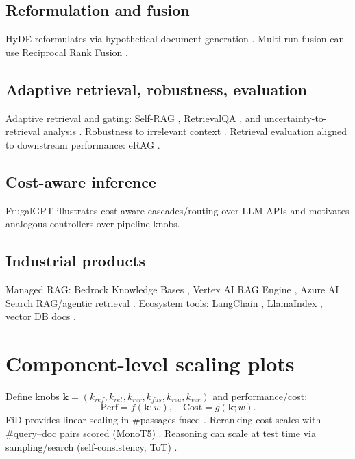 \documentclass[11pt,a4paper]{article}
\begin{document}
\subsection{Reformulation and fusion}
HyDE reformulates via hypothetical document generation \cite{Gao2022HyDE}.
Multi-run fusion can use Reciprocal Rank Fusion \cite{Cormack2009RRF}.

\subsection{Adaptive retrieval, robustness, evaluation}
Adaptive retrieval and gating: Self-RAG \cite{Asai2024SelfRAG}, RetrievalQA \cite{Zhang2024RetrievalQA},
and uncertainty-to-retrieval analysis \cite{Ni2024WhenRetrieval}.
Robustness to irrelevant context \cite{Yoran2024RobustRAG}.
Retrieval evaluation aligned to downstream performance: eRAG \cite{Salemi2024ERAG}.

\subsection{Cost-aware inference}
FrugalGPT illustrates cost-aware cascades/routing over LLM APIs \cite{Chen2023FrugalGPT} and
motivates analogous controllers over pipeline knobs.

\subsection{Industrial products}
Managed RAG: Bedrock Knowledge Bases \cite{AWSBedrockKB}, Vertex AI RAG Engine \cite{VertexRAGOverview},
Azure AI Search RAG/agentic retrieval \cite{AzureAISearchRAG2026}.
Ecosystem tools: LangChain \cite{LangChainRetrieval}, LlamaIndex \cite{LlamaIndexRAG},
vector DB docs \cite{WeaviateRAG,PineconeRAGChatbot}.

\section{Component-level scaling plots}
Define knobs $\mathbf{k}=(k_{ref},k_{ret},k_{rer},k_{fus},k_{rea},k_{ver})$ and
performance/cost:
\begin{equation}
\mathrm{Perf}=f(\mathbf{k};w), \quad \mathrm{Cost}=g(\mathbf{k};w).
\end{equation}
FiD provides linear scaling in \#passages fused \cite{Izacard2021FiD}.
Reranking cost scales with \#query--doc pairs scored (MonoT5) \cite{Nogueira2020MonoT5}.
Reasoning can scale at test time via sampling/search (self-consistency, ToT) \cite{Wang2022SelfConsistency,Yao2023ToT}.
\end{document}
